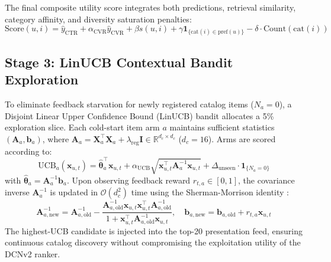 The final composite utility score integrates both predictions, retrieval similarity, category affinity, and diversity saturation penalties:
\begin{equation}
\text{Score}(u, i) = \hat{y}_{\text{CTR}} + \alpha_{\text{CVR}} \hat{y}_{\text{CVR}} + \beta s(u, i) + \gamma \mathbf{1}_{\{\text{cat}(i) \in \text{pref}(u)\}} - \delta \cdot \text{Count}(\text{cat}(i))
\end{equation}

\subsection{Stage 3: LinUCB Contextual Bandit Exploration}
To eliminate feedback starvation for newly registered catalog items ($N_a = 0$), a Disjoint Linear Upper Confidence Bound (LinUCB) bandit \cite{li2010contextual,auer2002finite} allocates a 5\% exploration slice. Each cold-start item arm $a$ maintains sufficient statistics $(\mathbf{A}_a, \mathbf{b}_a)$, where $\mathbf{A}_a = \mathbf{X}_a^\top \mathbf{X}_a + \lambda_{\text{reg}}\mathbf{I} \in \mathbb{R}^{d_c \times d_c}$ ($d_c = 16$). Arms are scored according to:
\begin{equation}
\text{UCB}_a(\mathbf{x}_{u, t}) = \hat{\boldsymbol{\theta}}_a^\top \mathbf{x}_{u, t} + \alpha_{\text{UCB}} \sqrt{\mathbf{x}_{u, t}^\top \mathbf{A}_a^{-1} \mathbf{x}_{u, t}} + \Delta_{\text{unseen}} \cdot \mathbf{1}_{\{N_a = 0\}}
\end{equation}
with $\hat{\boldsymbol{\theta}}_a = \mathbf{A}_a^{-1} \mathbf{b}_a$. Upon observing feedback reward $r_{t, a} \in [0, 1]$, the covariance inverse $\mathbf{A}_a^{-1}$ is updated in $\mathcal{O}(d_c^2)$ time using the Sherman-Morrison identity \cite{sherman1950adjustment}:
\begin{equation}
\mathbf{A}_{a, \text{new}}^{-1} = \mathbf{A}_{a, \text{old}}^{-1} - \frac{\mathbf{A}_{a, \text{old}}^{-1} \mathbf{x}_{u, t} \mathbf{x}_{u, t}^\top \mathbf{A}_{a, \text{old}}^{-1}}{1 + \mathbf{x}_{u, t}^\top \mathbf{A}_{a, \text{old}}^{-1} \mathbf{x}_{u, t}}, \quad \mathbf{b}_{a, \text{new}} = \mathbf{b}_{a, \text{old}} + r_{t, a} \mathbf{x}_{u, t}
\end{equation}
The highest-UCB candidate is injected into the top-20 presentation feed, ensuring continuous catalog discovery without compromising the exploitation utility of the DCNv2 ranker.
